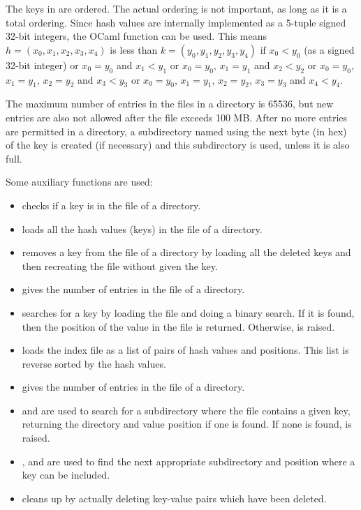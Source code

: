 The keys in {} are ordered. The actual ordering is not important, as long
as it is a total ordering. Since hash values are internally implemented as
a 5-tuple signed 32-bit integers, the OCaml function {}
can be used. This means $h = (x_0,x_1,x_2,x_3,x_4)$ is less than $k=(y_0,y_1,y_2,y_3,y_4)$
if 
$x_0 < y_0$ (as a signed 32-bit integer)
or $x_0 = y_0$ and $x_1 < y_1$
or $x_0 = y_0$, $x_1 = y_1$ and $x_2 < y_2$
or $x_0 = y_0$, $x_1 = y_1$, $x_2 = y_2$ and $x_3 < y_3$
or $x_0 = y_0$, $x_1 = y_1$, $x_2 = y_2$, $x_3 = y_3$ and $x_4 < y_4$.

The maximum number of entries in the files in a directory is 65536,
but new entries are also not allowed after the {} file
exceeds 100 MB.
After no more entries are permitted in a directory,
a subdirectory named using the next byte (in hex) of the key is
created (if necessary) and this subdirectory is used, unless it is also full.

Some auxiliary functions are used:
\begin{itemize}
\item {} checks if a key is in the {} file of a directory.
\item {} loads all the hash values (keys) in the {} file of a directory.
\item {} removes a key from the {} file of a directory
by loading all the deleted keys and then recreating the {} file without given the key.
\item {} gives the number of entries in the {} file of a directory.
\item {}
searches for a key
by loading the {} file and doing a binary search.
If it is found, then the position of the value in the {}
file is returned. Otherwise, {} is raised.
\item {} loads the index file as a list of pairs of hash values and positions.
This list is reverse sorted by the hash values.
\item {} gives the number of entries in the {} file of a directory.
\item {} and {}
are used to search for a subdirectory where the {} file
contains a given key, returning the directory and value position
if one is found. If none is found, {}
is raised.
\item {}, {} and {}
are used to find the next appropriate subdirectory and position where a key
can be included.
\item {} cleans up by actually deleting key-value pairs which have been deleted.
\end{itemize}

